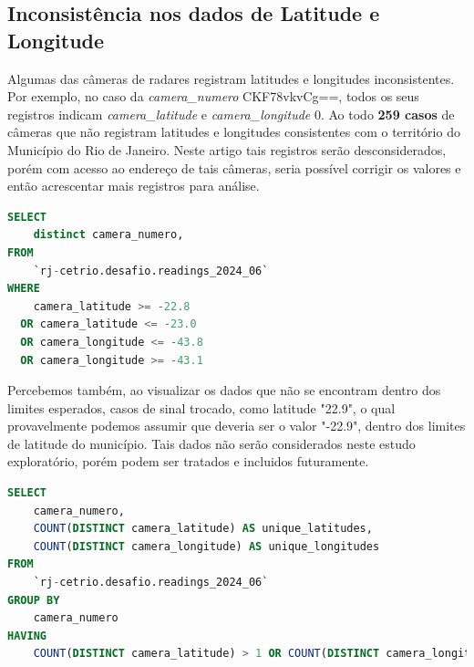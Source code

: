 \documentclass{article}
\begin{document}
\subsection{Inconsistência nos dados de Latitude e Longitude}

Algumas das câmeras de radares registram latitudes e longitudes inconsistentes. Por exemplo, no caso da \textit{camera\_numero} CKF78vkvCg==, todos os seus registros indicam \textit{camera\_latitude} e \textit{camera\_longitude} 0. Ao todo \textbf{259 casos} de câmeras que não registram latitudes e longitudes consistentes com o território do Município do Rio de Janeiro. Neste artigo tais registros serão desconsiderados, porém com acesso ao endereço de tais câmeras, seria possível corrigir os valores e então acrescentar mais registros para análise.

\begin{lstlisting}[language=SQL,caption={Query SQL para identificar se existem casos inconsistentes onde câmeras registram valores de latitude e longitude fora do território do Município do Rio de Janeiro. Existem 259 casos de câmeras com problemas sistemáticos neste quesito.},label={lst:sqlquery2}]
SELECT 
    distinct camera_numero, 
FROM 
    `rj-cetrio.desafio.readings_2024_06`
WHERE 
    camera_latitude >= -22.8
  OR camera_latitude <= -23.0
  OR camera_longitude <= -43.8
  OR camera_longitude >= -43.1
\end{lstlisting}

Percebemos também, ao visualizar os dados que não se encontram dentro dos limites esperados, casos de sinal trocado, como latitude "22.9", o qual provavelmente podemos assumir que deveria ser o valor "-22.9", dentro dos limites de latitude do município. Tais dados não serão considerados neste estudo exploratório, porém podem ser tratados e incluidos futuramente.

\begin{lstlisting}[language=SQL,caption={Query SQL para identificar se existem casos inconsistentes onde registros feitos pela mesma câmera de radar apresentam valores diferentes de latitude e longitude entre si. Não existem.},label={lst:sqlquery3}]
SELECT 
    camera_numero, 
    COUNT(DISTINCT camera_latitude) AS unique_latitudes,
    COUNT(DISTINCT camera_longitude) AS unique_longitudes
FROM 
    `rj-cetrio.desafio.readings_2024_06`
GROUP BY
    camera_numero
HAVING 
    COUNT(DISTINCT camera_latitude) > 1 OR COUNT(DISTINCT camera_longitude) > 1;
\end{lstlisting}
\end{document}

